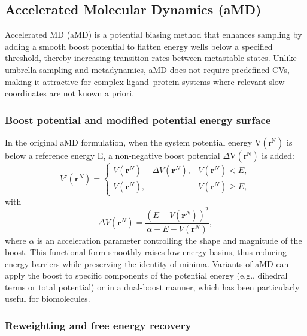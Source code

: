 \documentclass[12pt]{article}
\begin{document}
\subsection{Accelerated Molecular Dynamics (aMD)}

Accelerated MD (aMD) is a potential biasing method that enhances sampling by adding a smooth boost potential to flatten energy wells below a specified threshold, thereby increasing transition rates between metastable states\cite{CH9_Hamelberg2004,CH9_Markwick2011}. Unlike umbrella sampling and metadynamics, aMD does not require predefined CVs, making it attractive for complex ligand--protein systems where relevant slow coordinates are not known a priori.

\subsubsection{Boost potential and modified potential energy surface}

In the original aMD formulation, when the system potential energy $\textrm{V}(\textrm{r}^\textrm{N})$ is below a reference energy E, a non-negative boost potential $\Delta \textrm{V}(\textrm{r}^\textrm{N})$ is added:
\begin{equation}
V'(\mathbf{r}^N) =
\begin{cases}
V(\mathbf{r}^N) + \Delta V(\mathbf{r}^N), & V(\mathbf{r}^N) < E, \\
V(\mathbf{r}^N), & V(\mathbf{r}^N) \geq E,
\end{cases}
\end{equation}
with
\begin{equation}
\Delta V(\mathbf{r}^N) = \frac{\left(E - V(\mathbf{r}^N)\right)^2}{\alpha + E - V(\mathbf{r}^N)},
\end{equation}
where $\alpha$ is an acceleration parameter controlling the shape and magnitude of the boost\cite{CH9_Hamelberg2004}. This functional form smoothly raises low-energy basins, thus reducing energy barriers while preserving the identity of minima. Variants of aMD can apply the boost to specific components of the potential energy (e.g., dihedral terms or total potential) or in a dual-boost manner, which has been particularly useful for biomolecules\cite{CH9_Markwick2011}.

\subsubsection{Reweighting and free energy recovery}
\end{document}
